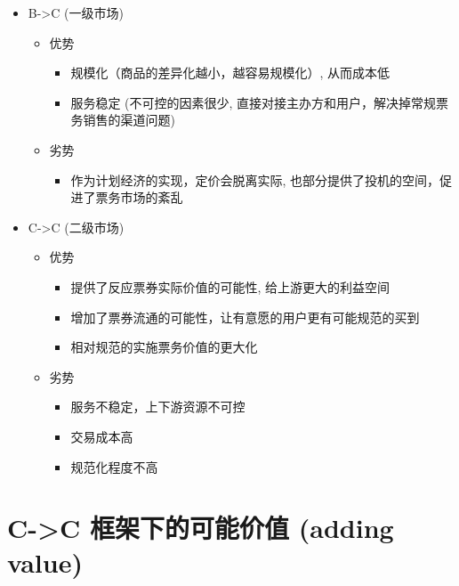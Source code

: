 \documentclass[11pt,a4paper]{article}
\begin{document}
\begin{itemize}
\item B->C (一级市场)

\begin{itemize}
\item 优势

\begin{itemize}
\item 规模化（商品的差异化越小，越容易规模化）, 从而成本低
\item 服务稳定 (不可控的因素很少, 直接对接主办方和用户，解决掉常规票务销售的渠道问题)
\end{itemize}

\item 劣势

\begin{itemize}
\item 作为计划经济的实现，定价会脱离实际, 也部分提供了投机的空间，促进了票务市场的紊乱
\end{itemize}
\end{itemize}

\item C->C (二级市场)

\begin{itemize}
\item 优势

\begin{itemize}
\item 提供了反应票券实际价值的可能性, 给上游更大的利益空间
\item 增加了票券流通的可能性，让有意愿的用户更有可能规范的买到
\item 相对规范的实施票务价值的更大化
\end{itemize}

\item 劣势

\begin{itemize}
\item 服务不稳定，上下游资源不可控
\item 交易成本高
\item 规范化程度不高
\end{itemize}
\end{itemize}
\end{itemize}

\section*{C->C 框架下的可能价值 (adding value)}
\label{sec:orgheadline5}
\end{document}
